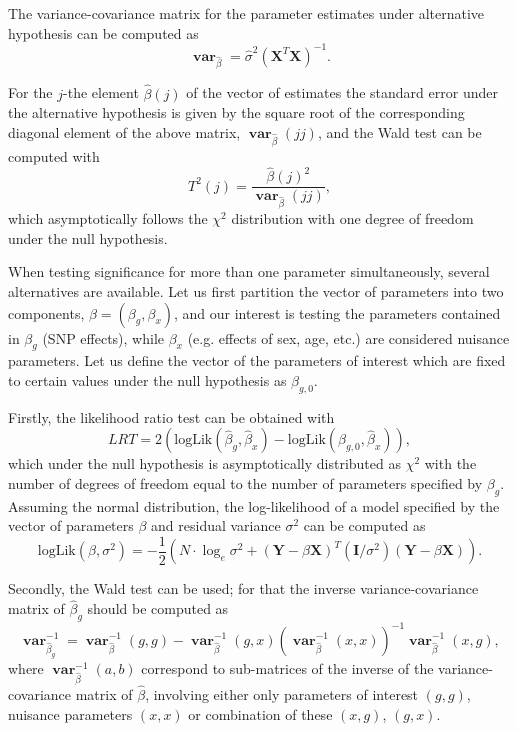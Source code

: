 \documentclass[12pt,a4paper]{article}
\DeclareMathOperator{\var}{\mathbf{var}}
\begin{document}
The variance-covariance matrix for the parameter estimates under
alternative hypothesis can be computed as
\begin{equation}
\var_{\hat{\beta}} = \hat{\sigma}^2 (\mathbf{X}^T\mathbf{X})^{-1}.
\end{equation}

For the $j$-the element $\hat{\beta}(j)$ of the vector of estimates the standard
error under the alternative hypothesis is given by the square root of the
corresponding diagonal element of the above matrix, $\var_{\hat{\beta}}(jj)$,
and the Wald test can be computed with
$$
T^2(j) = \frac{ \hat{\beta}(j)^2 }{ \var_{\hat{\beta}}(jj) },
$$
which asymptotically follows the $\chi^2$ distribution with one degree of
freedom under the null hypothesis.

When testing significance for more than one parameter simultaneously,
several alternatives are available. Let us first partition the vector of
parameters into two components, $\beta = (\beta_g,\beta_x)$, and our
interest is testing the parameters contained in $\beta_g$ (SNP effects),
while $\beta_x$ (e.g. effects of sex, age, etc.) are considered nuisance
parameters. Let us define the vector of the parameters of interest
which are fixed to certain values under the null hypothesis as
$\beta_{g,0}$.

Firstly, the likelihood ratio test can be obtained with
$$
LRT = 2 \left(\mathrm{logLik}(\hat{\beta}_g,\hat{\beta}_x) -
\mathrm{logLik}(\beta_{g,0},\hat{\beta}_x) \right),
$$
which under the null hypothesis is asymptotically distributed as
$\chi^2$ with the
number of degrees of freedom equal to the number of parameters specified
by $\beta_g$. Assuming the normal distribution, the log-likelihood of a
model specified by the vector of parameters $\beta$ and residual variance
$\sigma^2$ can be computed as
$$
\mathrm{logLik}(\beta,\sigma^2) =
-\frac{1}{2} \left( N \cdot \log_e \sigma^2 +
(\mathbf{Y} - \beta \mathbf{X})^T (\mathbf{I}/\sigma^2) (\mathbf{Y} -
\beta \mathbf{X}) \right).
$$

Secondly, the Wald test can be used; for that the inverse
variance-covariance matrix of $\hat{\beta}_g$ should be computed as
$$
\var_{\hat{\beta}_g}^{-1} = \var_{\hat{\beta}}^{-1}(g,g) -
\var_{\hat{\beta}}^{-1}(g,x) \left(
  \var_{\hat{\beta}}^{-1}(x,x) \right)^{-1}
  \var_{\hat{\beta}}^{-1}(x,g),
$$
where $\var_{\hat{\beta}}^{-1}(a,b)$ correspond to sub-matrices of the
inverse of the variance-covariance matrix of $\hat{\beta}$, involving
either only parameters of interest $(g,g)$, nuisance parameters
$(x,x)$ or combination of these $(x,g)$, $(g,x)$.
\end{document}
